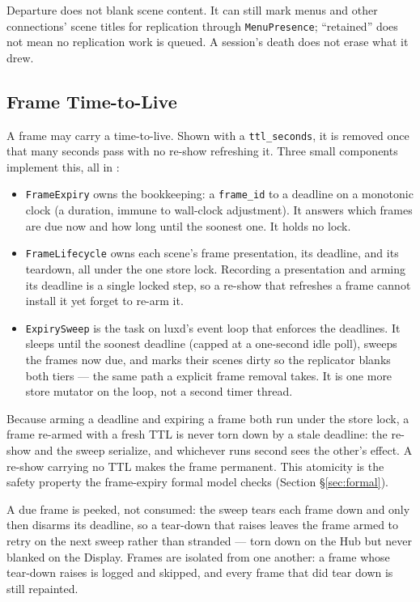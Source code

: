 \documentclass[a4paper,10pt]{article}
\newcommand{\modpath}[1]{\path{src/punt_lux/#1}}
\newcommand{\field}[1]{\texttt{#1}}
\begin{document}
Departure does not blank scene content. It can still mark menus and other
connections' scene titles for replication through \texttt{MenuPresence};
``retained'' does not mean no replication work is queued. A session's death
does not erase what it drew.

\subsection{Frame Time-to-Live}

A frame may carry a time-to-live.  Shown with a \field{ttl\_seconds}, it is
removed once that many seconds pass with no re-show refreshing it.  Three
small components implement this, all in \modpath{hub/}:

\begin{itemize}
  \item \texttt{FrameExpiry} owns the bookkeeping: a \field{frame\_id} to a
    deadline on a monotonic clock (a duration, immune to wall-clock
    adjustment).  It answers which frames are due now and how long until
    the soonest one.  It holds no lock.
  \item \texttt{FrameLifecycle} owns each scene's frame presentation, its
    deadline, and its teardown, all under the one store lock.  Recording a
    presentation and arming its deadline is a single locked step, so a
    re-show that refreshes a frame cannot install it yet forget to re-arm
    it.
  \item \texttt{ExpirySweep} is the task on luxd's event loop that enforces
    the deadlines.  It sleeps until the soonest deadline (capped at a
    one-second idle poll), sweeps the frames now due, and marks their
    scenes dirty so the replicator blanks both tiers --- the same path a
    explicit frame removal takes. It is one more store mutator on the loop,
    not a second timer thread.
\end{itemize}

Because arming a deadline and expiring a frame both run under the store
lock, a frame re-armed with a fresh TTL is never torn down by a stale
deadline: the re-show and the sweep serialize, and whichever runs second
sees the other's effect.  A re-show carrying no TTL makes the frame
permanent.  This atomicity is the safety property the frame-expiry formal
model checks (Section \S\ref{sec:formal}).

A due frame is peeked, not consumed: the sweep tears each frame down and
only then disarms its deadline, so a tear-down that raises leaves the frame
armed to retry on the next sweep rather than stranded --- torn down on the
Hub but never blanked on the Display.  Frames are isolated from one
another: a frame whose tear-down raises is logged and skipped, and every
frame that did tear down is still repainted.
\end{document}
